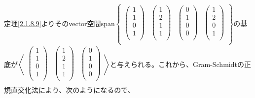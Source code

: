 \documentclass[dvipdfmx]{jsarticle}
\begin{document}
定理\ref{2.1.8.9}よりそのvector空間$\mathrm{span}\begin{Bmatrix}
\begin{pmatrix}
1 \\
1 \\
0 \\
1 \\
\end{pmatrix} & \begin{pmatrix}
1 \\
2 \\
1 \\
1 \\
\end{pmatrix} & \begin{pmatrix}
0 \\
1 \\
0 \\
0 \\
\end{pmatrix} & \begin{pmatrix}
1 \\
2 \\
0 \\
1 \\
\end{pmatrix} \\
\end{Bmatrix}$の基底が$\left\langle \begin{matrix}
\begin{pmatrix}
1 \\
1 \\
0 \\
1 \\
\end{pmatrix} & \begin{pmatrix}
1 \\
2 \\
1 \\
1 \\
\end{pmatrix} & \begin{pmatrix}
0 \\
1 \\
0 \\
0 \\
\end{pmatrix} \\
\end{matrix} \right\rangle$と与えられる。これから、Gram-Schmidtの正規直交化法により、次のようになるので、
\end{document}

